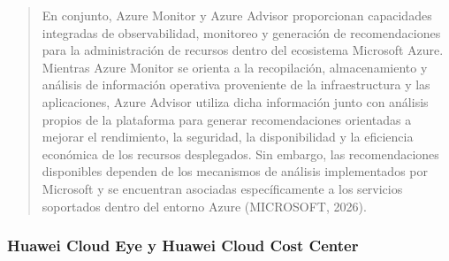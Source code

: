 \documentclass[
]{article}
\begin{document}
\begin{quote}
En conjunto, Azure Monitor y Azure Advisor proporcionan capacidades
integradas de observabilidad, monitoreo y generación de recomendaciones
para la administración de recursos dentro del ecosistema Microsoft
Azure. Mientras Azure Monitor se orienta a la recopilación,
almacenamiento y análisis de información operativa proveniente de la
infraestructura y las aplicaciones, Azure Advisor utiliza dicha
información junto con análisis propios de la plataforma para generar
recomendaciones orientadas a mejorar el rendimiento, la seguridad, la
disponibilidad y la eficiencia económica de los recursos desplegados.
Sin embargo, las recomendaciones disponibles dependen de los mecanismos
de análisis implementados por Microsoft y se encuentran asociadas
específicamente a los servicios soportados dentro del entorno Azure
(MICROSOFT, 2026).
\end{quote}

\subsubsection{Huawei Cloud Eye y Huawei Cloud Cost
Center}\label{huawei-cloud-eye-y-huawei-cloud-cost-center}
\end{document}
